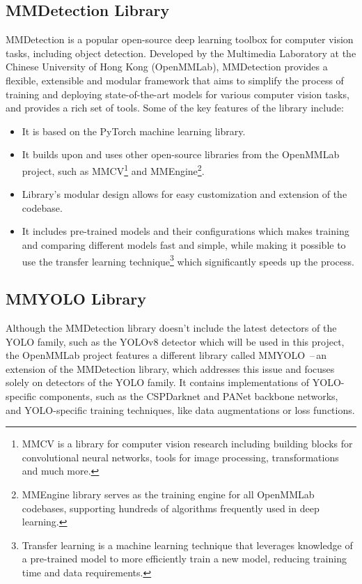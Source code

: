 \subsection{MMDetection Library}

MMDetection \cite{MMDetection} is a popular open-source deep learning toolbox
for computer vision tasks, including object detection. Developed by the
Multimedia Laboratory at the Chinese University of Hong Kong (OpenMMLab),
MMDetection provides a flexible, extensible and modular framework that aims to
simplify the process of training and deploying state-of-the-art models for
various computer vision tasks, and provides a rich set of tools. Some of the key
features of the library include:

\begin{itemize}
    \item It is based on the PyTorch machine learning library.
    \item It builds upon and uses other open-source libraries from the OpenMMLab
    project, such as MMCV\footnote{MMCV is a library for computer vision
    research including building blocks for convolutional neural networks, tools
    for image processing, transformations and much more.} and
    MMEngine\footnote{MMEngine library serves as the training engine for all
    OpenMMLab codebases, supporting hundreds of algorithms frequently used in
    deep learning.}.
    \item Library's modular design allows for easy customization and extension
    of the codebase.
    \item It includes pre-trained models and their configurations which makes
    training and comparing different models fast and simple, while making it
    possible to use the transfer learning technique\footnote{Transfer learning
    is a machine learning technique that leverages knowledge of a pre-trained
    model to more efficiently train a new model, reducing training time and data
    requirements.} which significantly speeds up the process.
\end{itemize}


\subsection{MMYOLO Library}

Although the MMDetection library doesn't include the latest detectors of the
YOLO family, such as the YOLOv8 detector which will be used in this project, the
OpenMMLab project features a different library called MMYOLO
\cite{MMYOLO}\,--\,an extension of the MMDetection library, which addresses this
issue and focuses solely on detectors of the YOLO family. It contains
implementations of YOLO-specific components, such as the CSPDarknet and PANet
backbone networks, and YOLO-specific training techniques, like data
augmentations or loss functions.


